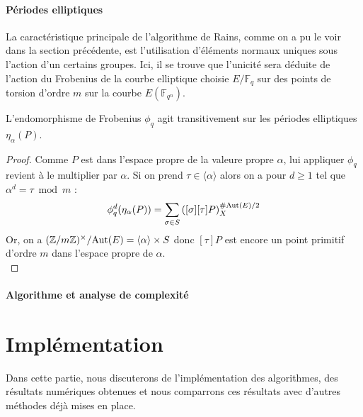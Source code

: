 \documentclass[a4paper]{article} %
\numberwithin{section}{part}
\numberwithin{equation}{section}
\newcommand\zmodninv[1]{(\mathbb{Z}/#1\mathbb{Z})^{\times}}
\newcommand\GF[1]{\mathbb{F}_{#1}}
\begin{document}
\subsection{Périodes elliptiques}
\label{sec:perell}
La caractéristique principale de l'algorithme de Rains, comme on a pu le voir
dans la section précédente, est l'utilisation d'éléments normaux uniques sous
l'action d'un certains groupes. Ici, il se trouve que l'unicité sera déduite de
l'action du Frobenius de la courbe elliptique choisie $E/\GF{q}$ sur des points
de torsion d'ordre $m$ sur la courbe $E(\GF{q^n})$.
\begin{prop}
L'endomorphisme de Frobenius $\phi_q$ agit transitivement sur les périodes 
elliptiques $\eta_{\alpha}(P)$. \end{prop}
\begin{proof}
Comme $P$ est dans l'espace propre de la valeure propre $\alpha$, lui appliquer 
$\phi_q$ revient à le multiplier par $\alpha$. Si on prend 
$\tau\in\langle\alpha\rangle$ alors on a pour $d\geq1$ tel que $\alpha^d = \tau 
\bmod m$ :
\begin{equation}
\phi_q^d(\eta_{\alpha}(P)) = \sum_{\sigma\in
S}{\left([\sigma][\tau]P\right)_X^{\#\textup{Aut}(E)/2}}
\end{equation}
Or, on a $\zmodninv{m}/\textup{Aut}(E) = \langle\alpha\rangle \times S$ donc
$[\tau]P$ est encore un point primitif d'ordre $m$ dans l'espace propre de 
$\alpha$.\\
\end{proof}
\subsection{Algorithme et analyse de complexité}

\part{Implémentation}
\label{trois}
Dans cette partie, nous discuterons de l'implémentation des algorithmes, des
résultats numériques obtenues et nous comparrons ces résultats avec d'autres
méthodes déjà mises en place. 
\end{document}
